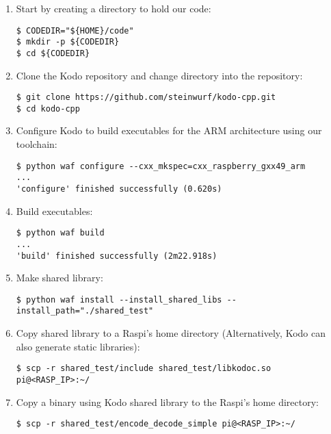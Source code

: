 \begin{enumerate}

\item Start by creating a directory to hold our code:
\begin{lstlisting}[]
$ CODEDIR="${HOME}/code"
$ mkdir -p ${CODEDIR}
$ cd ${CODEDIR}
\end{lstlisting}
\FloatBarrier
\vspace{-5mm}

\item Clone the Kodo repository and change directory into the repository:
\begin{lstlisting}[]
$ git clone https://github.com/steinwurf/kodo-cpp.git
$ cd kodo-cpp
\end{lstlisting}
\FloatBarrier
\vspace{-5mm}

\item Configure Kodo to build executables for the \ac{ARM} architecture using our toolchain:
\begin{lstlisting}[]
$ python waf configure --cxx_mkspec=cxx_raspberry_gxx49_arm
...
'configure' finished successfully (0.620s)
\end{lstlisting}
\FloatBarrier
\vspace{-5mm}

\item Build executables:
\begin{lstlisting}[]
$ python waf build
...
'build' finished successfully (2m22.918s)
\end{lstlisting}
\FloatBarrier
\vspace{-5mm}


\item Make shared library:
\begin{lstlisting}[]
$ python waf install --install_shared_libs --install_path="./shared_test"
\end{lstlisting}
\FloatBarrier
\vspace{-5mm}

\item Copy shared library to a \ac{Raspi}'s home directory (Alternatively, Kodo can also generate static libraries):
\begin{lstlisting}[]
$ scp -r shared_test/include shared_test/libkodoc.so pi@<RASP_IP>:~/
\end{lstlisting}
\FloatBarrier
\vspace{-5mm}

\item Copy a binary using Kodo shared library to the \ac{Raspi}'s home directory:
\begin{lstlisting}[]
$ scp -r shared_test/encode_decode_simple pi@<RASP_IP>:~/
\end{lstlisting}
\FloatBarrier
\vspace{-5mm}


\end{enumerate}
